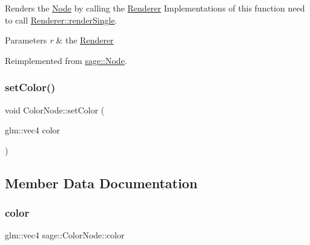 Renders the \mbox{\hyperlink{classsage_1_1Node}{Node}} by calling the \mbox{\hyperlink{classsage_1_1Renderer}{Renderer}} Implementations of this function need to call \mbox{\hyperlink{classsage_1_1Renderer_aa79cfd587fa85ae8ea7ccf465825d212}{Renderer\+::render\+Single}}. 


\begin{DoxyParams}{Parameters}
{\em r} & the \mbox{\hyperlink{classsage_1_1Renderer}{Renderer}} \\
\hline
\end{DoxyParams}


Reimplemented from \mbox{\hyperlink{classsage_1_1Node_a1a5d13b9c959039084843403382f73eb}{sage\+::\+Node}}.

\mbox{\label{classsage_1_1ColorNode_ae64cb2f7ba2a12750952047c6fe69cb4}} 
\subsubsection{\texorpdfstring{setColor()}{setColor()}}
{\footnotesize\ttfamily void Color\+Node\+::set\+Color (\begin{DoxyParamCaption}\item[{glm\+::vec4}]{color }\end{DoxyParamCaption})}



\subsection{Member Data Documentation}
\mbox{\label{classsage_1_1ColorNode_a5fc4ee3eac3b56392d7c46a8359ba97c}} 
\subsubsection{\texorpdfstring{color}{color}}
{\footnotesize\ttfamily glm\+::vec4 sage\+::\+Color\+Node\+::color\hspace{0.3cm}{\ttfamily [private]}}

\mbox{\label{classsage_1_1ColorNode_a04b687374b9c171ff820c514f15b0ae0}} 
